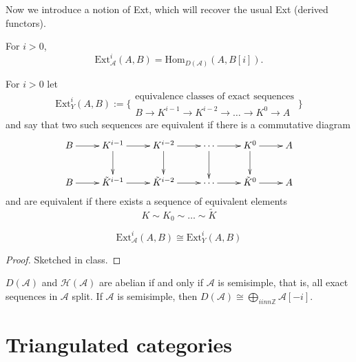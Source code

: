 Now we introduce a notion of Ext, which will recover the usual Ext (derived
functors).

\begin{definition}
\label{definition-Ext}
For $i>0$,
$$
\text{Ext}^i_{\mathcal{A}}(A,B)=\text{Hom}_{D(\mathcal{A})}(A,B[i]).
$$
\end{definition}
\begin{definition}[Yoneda]
\label{definition-Yoneda}
For $i>0$ let
$$
\text{Ext}_Y^i(A,B):=\{\substack{\text{equivalence classes of exact sequences}\\
B\to K^{i-1}\to K^{i-2}\to \ldots \to K^0 \to A}\}
$$
and say that two such sequences are equivalent if there is a commutative diagram
$$
\xymatrix{
B\ar[r]&  K^{i-1}\ar[r]\ar[d]&  K^{i-2}\ar[r]\ar[d]& \cdots\ar[r]\ar[d]
&K^0\ar[r]\ar[d]&A\\
B\ar[r]&  \tilde{K}^{i-1}\ar[r]&  \tilde{K}^{i-2}\ar[r]& \cdots\ar[r]
&\tilde{K}^0\ar[r]&A
}
$$
and are equivalent if there exists a sequence of equivalent elements
$$
K \sim K_0 \sim \ldots \sim \tilde{K}
$$
\end{definition}

\begin{proposition}
\label{proposition-Ext}
$$
\text{Ext}_{\mathcal{A}}^i(A,B) \cong \text{Ext}_Y^i(A,B)
$$
\end{proposition}

\begin{proof}
Sketched in class.
\end{proof}

\begin{exercise}
\label{exercise-derived-and-homotopy-categories-abelian-characterization}
$D(\mathcal{A})$ and  $\mathcal{H}(\mathcal{A})$ are abelian if and only if
$\mathcal{A}$ is semisimple, that is, all exact sequences in $\mathcal{A}$
split. If $\mathcal{A}$ is semisimple, then $D(\mathcal{A})\cong \bigoplus_{i
inn \mathbb{Z}}\mathcal{A}[-i]$.
\end{exercise}

\section{Triangulated categories}
\label{subsection-triangulated-categories}

